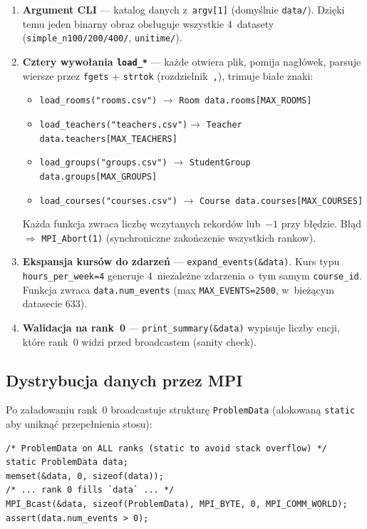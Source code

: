 \documentclass{common/sprawozdanie-agh}
\begin{document}
\begin{enumerate}
\item \textbf{Argument CLI} --- katalog danych z~\texttt{argv[1]} (domyślnie \texttt{data/}). Dzięki temu jeden binarny obraz obsługuje wszystkie 4~datasety (\texttt{simple\_n100/200/400/}, \texttt{unitime/}).
\item \textbf{Cztery wywołania \texttt{load\_*}} --- każde otwiera plik, pomija nagłówek, parsuje wiersze przez \texttt{fgets} + \texttt{strtok} (rozdzielnik~\texttt{,}), trimuje białe znaki:
\begin{itemize}\small
    \item \texttt{load\_rooms("rooms.csv")}     $\to$ \texttt{Room data.rooms[MAX\_ROOMS]}
    \item \texttt{load\_teachers("teachers.csv")}$\to$ \texttt{Teacher data.teachers[MAX\_TEACHERS]}
    \item \texttt{load\_groups("groups.csv")}    $\to$ \texttt{StudentGroup data.groups[MAX\_GROUPS]}
    \item \texttt{load\_courses("courses.csv")}  $\to$ \texttt{Course data.courses[MAX\_COURSES]}
\end{itemize}
Każda funkcja zwraca liczbę wczytanych rekordów lub~$-1$ przy błędzie. Błąd $\Rightarrow$ \texttt{MPI\_Abort(1)} (synchroniczne zakończenie wszystkich rankow).

\item \textbf{Ekspansja kursów do zdarzeń} --- \texttt{expand\_events(\&data)}. Kurs typu \texttt{hours\_per\_week=4} generuje 4~niezależne zdarzenia o~tym samym \texttt{course\_id}. Funkcja zwraca \texttt{data.num\_events} (max \texttt{MAX\_EVENTS=2500}, w~bieżącym datasecie 633).

\item \textbf{Walidacja na rank~0} --- \texttt{print\_summary(\&data)} wypisuje liczby encji, które rank~0 widzi przed broadcastem (sanity check).
\end{enumerate}

\subsection{Dystrybucja danych przez MPI}

Po załadowaniu rank~0 broadcastuje strukturę \texttt{ProblemData} (alokowaną \texttt{static} aby uniknąć przepełnienia stosu):

\begin{lstlisting}[style=cstyle, caption={Broadcast struktury problemu (main.c:107)}]
/* ProblemData on ALL ranks (static to avoid stack overflow) */
static ProblemData data;
memset(&data, 0, sizeof(data));
/* ... rank 0 fills `data` ... */
MPI_Bcast(&data, sizeof(ProblemData), MPI_BYTE, 0, MPI_COMM_WORLD);
assert(data.num_events > 0);
\end{lstlisting}
\end{document}
